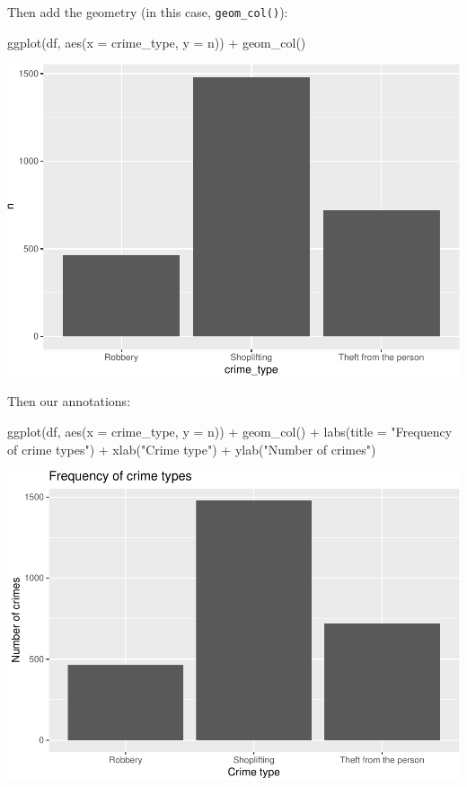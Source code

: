 \documentclass[
]{book}
\makeatletter
\newenvironment{Shaded}{\begin{snugshade}}{\end{snugshade}}
\newcommand{\AttributeTok}[1]{\textcolor[rgb]{0.61,0.61,0.61}{#1}}
\newcommand{\FunctionTok}[1]{\textcolor[rgb]{0,0,0}{#1}}
\newcommand{\NormalTok}[1]{#1}
\newcommand{\SpecialCharTok}[1]{\textcolor[rgb]{0,0,0}{#1}}
\newcommand{\StringTok}[1]{\textcolor[rgb]{0.5,0.5,0.5}{#1}}
\newenvironment{kframe}{%
\medskip{}
\setlength{\fboxsep}{.8em}
 \def\at@end@of@kframe{}%
 \ifinner\ifhmode%
  \def\at@end@of@kframe{\end{minipage}}%
  \begin{minipage}{\columnwidth}%
 \fi\fi%
 \def\FrameCommand##1{\hskip\@totalleftmargin \hskip-\fboxsep
 \colorbox{shadecolor}{##1}\hskip-\fboxsep
     \hskip-\linewidth \hskip-\@totalleftmargin \hskip\columnwidth}%
 \MakeFramed {\advance\hsize-\width
   \@totalleftmargin\z@ \linewidth\hsize
   \@setminipage}}%
 {\par\unskip\endMakeFramed%
 \at@end@of@kframe}
\renewenvironment{Shaded}{\begin{kframe}}{\end{kframe}}
\makeatother
\begin{document}
Then add the geometry (in this case, \texttt{geom\_col()}):

\begin{Shaded}
\begin{Highlighting}[]
\FunctionTok{ggplot}\NormalTok{(df, }\FunctionTok{aes}\NormalTok{(}\AttributeTok{x =}\NormalTok{ crime\_type, }\AttributeTok{y =}\NormalTok{ n)) }\SpecialCharTok{+} 
  \FunctionTok{geom\_col}\NormalTok{()}
\end{Highlighting}
\end{Shaded}

\includegraphics{crime_mapping_files/figure-latex/unnamed-chunk-9-1.pdf}

Then our annotations:

\begin{Shaded}
\begin{Highlighting}[]
\FunctionTok{ggplot}\NormalTok{(df, }\FunctionTok{aes}\NormalTok{(}\AttributeTok{x =}\NormalTok{ crime\_type, }\AttributeTok{y =}\NormalTok{ n)) }\SpecialCharTok{+} 
  \FunctionTok{geom\_col}\NormalTok{() }\SpecialCharTok{+} 
  \FunctionTok{labs}\NormalTok{(}\AttributeTok{title =} \StringTok{"Frequency of crime types"}\NormalTok{) }\SpecialCharTok{+} 
  \FunctionTok{xlab}\NormalTok{(}\StringTok{"Crime type"}\NormalTok{) }\SpecialCharTok{+} 
  \FunctionTok{ylab}\NormalTok{(}\StringTok{"Number of crimes"}\NormalTok{)}
\end{Highlighting}
\end{Shaded}

\includegraphics{crime_mapping_files/figure-latex/unnamed-chunk-10-1.pdf}
\end{document}
